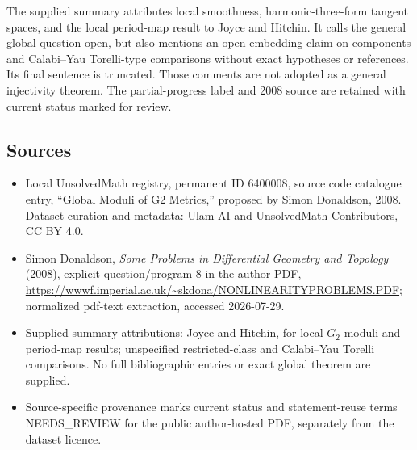 \documentclass[11pt]{article}
\begin{document}
The supplied summary attributes local smoothness, harmonic-three-form tangent spaces, and the local period-map result to Joyce and Hitchin. It calls the general global question open, but also mentions an open-embedding claim on components and Calabi--Yau Torelli-type comparisons without exact hypotheses or references. Its final sentence is truncated. Those comments are not adopted as a general injectivity theorem. The partial-progress label and 2008 source are retained with current status marked for review.
\subsection{Sources}
\begin{itemize}
\item Local UnsolvedMath registry, permanent ID 6400008, source code catalogue entry, ``Global Moduli of G2 Metrics,'' proposed by Simon Donaldson, 2008. Dataset curation and metadata: Ulam AI and UnsolvedMath Contributors, CC BY 4.0.
\item Simon Donaldson, \emph{Some Problems in Differential Geometry and Topology} (2008), explicit question/program 8 in the author PDF, \url{https://wwwf.imperial.ac.uk/~skdona/NONLINEARITYPROBLEMS.PDF}; normalized pdf-text extraction, accessed 2026-07-29.
\item Supplied summary attributions: Joyce and Hitchin, for local $G_2$ moduli and period-map results; unspecified restricted-class and Calabi--Yau Torelli comparisons. No full bibliographic entries or exact global theorem are supplied.
\item Source-specific provenance marks current status and statement-reuse terms NEEDS\_REVIEW for the public author-hosted PDF, separately from the dataset licence.
\end{itemize}
\end{document}
